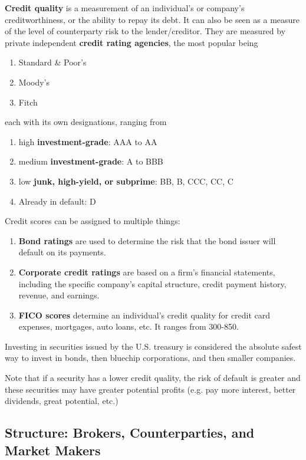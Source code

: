 \documentclass{article}
\begin{document}
    \begin{definition}
      \textbf{Credit quality} is a measurement of an individual's or company's creditworthiness, or the ability to repay its debt. It can also be seen as a measure of the level of counterparty risk to the lender/creditor. They are measured by private independent \textbf{credit rating agencies}, the most popular being
      \begin{enumerate}
        \item Standard \& Poor's 
        \item Moody's 
        \item Fitch
      \end{enumerate}
      each with its own designations, ranging from 
      \begin{enumerate}
        \item high \textbf{investment-grade}: AAA to AA
        \item medium \textbf{investment-grade}: A to BBB
        \item low \textbf{junk, high-yield, or subprime}: BB, B, CCC, CC, C
        \item Already in default: D 
      \end{enumerate}
      Credit scores can be assigned to multiple things:
      \begin{enumerate}
        \item \textbf{Bond ratings} are used to determine the risk that the bond issuer will default on its payments. 
        \item \textbf{Corporate credit ratings} are based on a firm's financial statements, including the specific company's capital structure, credit payment history, revenue, and earnings.
        \item \textbf{FICO scores} determine an individual's credit quality for credit card expenses, mortgages, auto loans, etc. It ranges from 300-850. 
      \end{enumerate}
      Investing in securities issued by the U.S. treasury is considered the absolute safest way to invest in bonds, then bluechip corporations, and then smaller companies. 
    \end{definition}

    Note that if a security has a lower credit quality, the risk of default is greater and these securities may have greater potential profits (e.g. pay more interest, better dividends, great potential, etc.) 

  \subsection{Structure: Brokers, Counterparties, and Market Makers}
\end{document}

